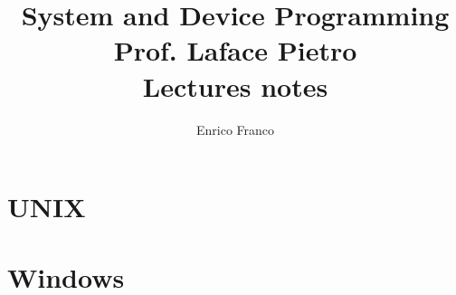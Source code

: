 \documentclass{report}
\author{Enrico Franco}
\title{System and Device Programming \\
	Prof. Laface Pietro \\
	Lectures notes}
\begin{document}
\maketitle
\tableofcontents

\part{UNIX}









\part{Windows}
\end{document}
